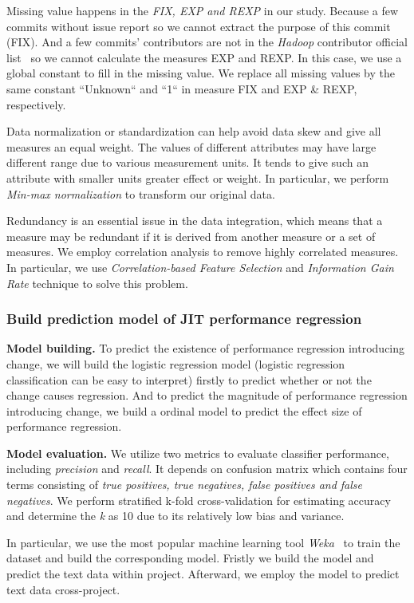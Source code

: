 Missing value happens in the \emph{FIX, EXP and REXP} in our study. Because a few commits without issue report so we cannot extract the purpose of this commit (FIX). And a few commits' contributors are not in the \emph{Hadoop} contributor official list~\cite{hadoop_2017} so we cannot calculate the measures EXP and REXP. In this case, we use a global constant to fill in the missing value. We replace all missing values by the same constant ``Unknown`` and ``1`` in measure FIX and EXP \& REXP, respectively.

Data normalization or standardization can help avoid data skew and give all measures an equal weight. The values of different attributes may have large different range due to various measurement units. It tends to give such an attribute with smaller units greater effect or weight. In particular, we perform \emph{Min-max normalization} to transform our original data.

Redundancy is an essential issue in the data integration, which means that a measure may be redundant if it is derived from another measure or a set of measures. We employ correlation analysis to remove highly correlated measures. In particular, we use \emph{Correlation-based Feature Selection} and \emph{Information Gain Rate} technique to solve this problem.

\subsubsection{Build prediction model of JIT performance regression}

\textbf{Model building.} To predict the existence of performance regression introducing change, we will build the logistic regression model (logistic regression classification can be easy to interpret) firstly to predict whether or not the change causes regression. And to predict the magnitude of performance regression introducing change, we build a ordinal model to predict the effect size of performance regression.

\textbf{Model evaluation.} We utilize two metrics to evaluate classifier performance, including \emph{precision} and \emph{recall}. It depends on confusion matrix which contains four terms consisting of \emph{true positives, true negatives, false positives and false negatives}. We perform stratified k-fold cross-validation for estimating accuracy and determine the \emph{k} as 10 due to its relatively low bias and variance.

In particular, we use the most popular machine learning tool \emph{Weka}~\cite{Hall:2009:weka} to train the dataset and build the corresponding model. Fristly we build the model and predict the text data within project. Afterward, we employ the model to predict text data cross-project.

